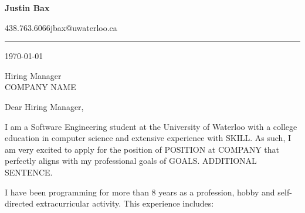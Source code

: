 \documentclass{article}
\newcommand{\cdelim}{\;\textbar\;}
\begin{document}
{\Huge\bfseries Justin Bax}

{\large 438.763.6066\cdelim jbax@uwaterloo.ca}



\vspace*{5pt}\hrule\vspace*{15pt}

\today

Hiring Manager\\
COMPANY NAME

\vspace{\baselineskip}

Dear Hiring Manager,

\vspace{\baselineskip}

I am a Software Engineering student at the University of Waterloo with a college education in computer science and extensive experience with SKILL.
As such, I am very excited to apply for the position of POSITION at COMPANY that perfectly aligns with my professional goals of GOALS. ADDITIONAL SENTENCE.

I have been programming for more than 8 years as a profession, hobby and self-directed extracurricular activity. This experience includes:
\end{document}
